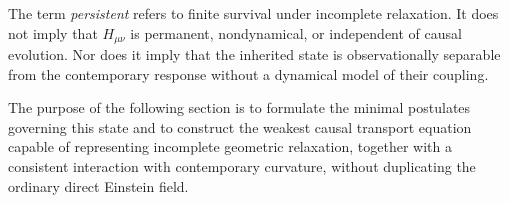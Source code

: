 The term \emph{persistent} refers to finite survival under incomplete
relaxation. It does not imply that $H_{\mu\nu}$ is permanent, nondynamical, or
independent of causal evolution. Nor does it imply that the inherited state is
observationally separable from the contemporary response without a dynamical
model of their coupling.

The purpose of the following section is to formulate the minimal postulates
governing this state and to construct the weakest causal transport equation
capable of representing incomplete geometric relaxation, together with a
consistent interaction with contemporary curvature, without duplicating the
ordinary direct Einstein field.
